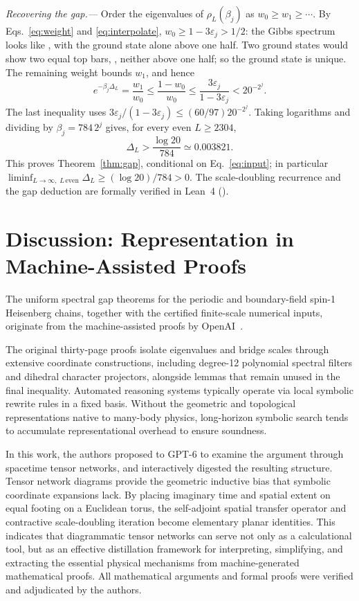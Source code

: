 \documentclass[aps,prl,reprint,amsmath,amssymb,nofootinbib,raggedbottom]{revtex4-2}
\begin{document}
\emph{Recovering the gap.---}
Order the eigenvalues of $\rho_L(\beta_j)$ as $w_0\ge w_1\ge\cdots$.
By Eqs.~\eqref{eq:weight} and \eqref{eq:interpolate},
$w_0\ge1-3\varepsilon_j>1/2$: the Gibbs spectrum looks like
, with the ground state alone above one half.
Two ground states would show two equal top bars, ,
neither above one half; so the ground state is unique. The remaining weight bounds $w_1$, and hence
\begin{equation}
 e^{-\beta_j\Delta_L}=\frac{w_1}{w_0}
 \le\frac{1-w_0}{w_0}
 \le\frac{3\varepsilon_j}{1-3\varepsilon_j}
 <20^{-2^j}.
 \label{eq:gapratio}
\end{equation}
The last inequality uses
$3\varepsilon_j/(1-3\varepsilon_j)\le(60/97)20^{-2^j}$.
Taking logarithms and dividing by $\beta_j=784\,2^j$ gives, for every
even $L\ge2304$,
\begin{equation}
 \boxed{\Delta_L>\frac{\log20}{784}\simeq0.003821.}
 \label{eq:gap}
\end{equation}
This proves Theorem~\ref{thm:gap}, conditional on Eq.~\eqref{eq:input};
in particular $\liminf_{L\to\infty,\;L\,\mathrm{even}}\Delta_L\ge(\log20)/784>0$.
The scale-doubling recurrence and the gap deduction are formally verified in Lean~4 ().


\section*{Discussion: Representation in Machine-Assisted Proofs}
The uniform spectral gap theorems for the periodic and boundary-field spin-1 Heisenberg chains, together with the certified finite-scale numerical inputs, originate from the machine-assisted proofs by OpenAI~\cite{source,boundary}.

The original thirty-page proofs isolate eigenvalues and bridge scales through extensive coordinate constructions, including degree-12 polynomial spectral filters and dihedral character projectors, alongside lemmas that remain unused in the final inequality. Automated reasoning systems typically operate via local symbolic rewrite rules in a fixed basis. Without the geometric and topological representations native to many-body physics, long-horizon symbolic search tends to accumulate representational overhead to ensure soundness.

In this work, the authors proposed to GPT-6 to examine the argument through spacetime tensor networks, and interactively digested the resulting structure. Tensor network diagrams provide the geometric inductive bias that symbolic coordinate expansions lack. By placing imaginary time and spatial extent on equal footing on a Euclidean torus, the self-adjoint spatial transfer operator and contractive scale-doubling iteration become elementary planar identities. This indicates that diagrammatic tensor networks can serve not only as a calculational tool, but as an effective distillation framework for interpreting, simplifying, and extracting the essential physical mechanisms from machine-generated mathematical proofs. All mathematical arguments and formal proofs were verified and adjudicated by the authors.
\end{document}
